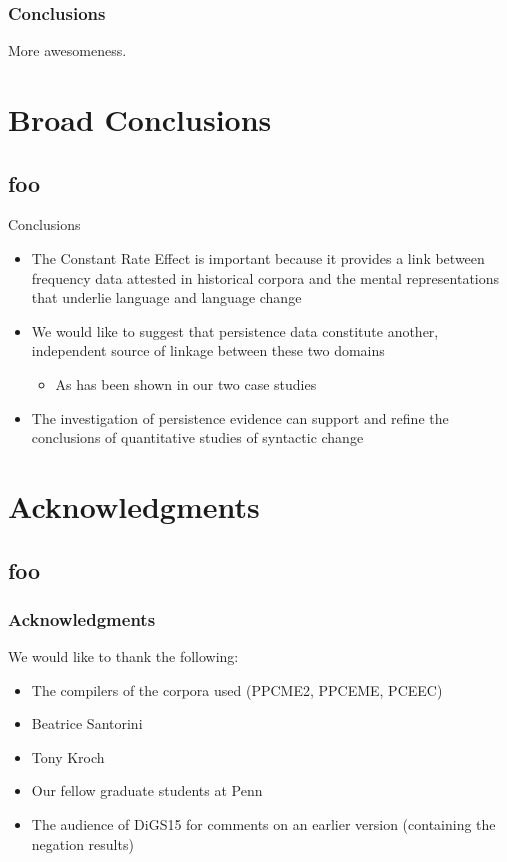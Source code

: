 \documentclass{digs-slides}
\begin{document}
\begin{frame}
    \frametitle{Conclusions}
    More awesomeness.
\end{frame}

\section{Broad Conclusions}
\label{sec:conclusion}

\subsection*{foo}

\begin{frame}{Conclusions}
    \begin{itemize}
      \item The Constant Rate Effect is important because it
        provides a link between frequency data attested in historical
        corpora and the mental representations that underlie language
        and language change
      \item We would like to suggest that persistence data constitute
        another, independent source of linkage between these two domains
        \begin{itemize}
          \item As has been shown in our two case studies
        \end{itemize}
      \item The investigation of persistence evidence can support and refine
        the conclusions of quantitative studies of syntactic change
    \end{itemize}
\end{frame}

\appendix{}

\section{Acknowledgments}

\subsection{foo}

\begin{frame}
    \frametitle{Acknowledgments}
    We would like to thank the following:
    \begin{itemize}
      \item The compilers of the corpora used (PPCME2, PPCEME, PCEEC)
      \item Beatrice Santorini
      \item Tony Kroch
      \item Our fellow graduate students at Penn
      \item The audience of DiGS15 for comments on an earlier version
        (containing the negation results)
    \end{itemize}
\end{frame}
\end{document}
